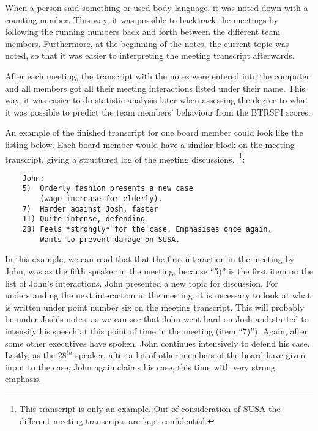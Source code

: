 \documentclass[a4paper,12pt,titlepage]{report}
\begin{document}
  When a person said something or used body language, it was noted down with a
  counting number. This way, it was possible to backtrack the meetings by following
  the running numbers back and forth between the different team members.
  Furthermore, at the beginning of the notes, the current topic was noted, so that it was
  easier to interpreting the meeting transcript afterwards.

  After each meeting, the transcript with the notes were entered into the computer
  and all members got all their meeting interactions listed under their
  name. This way, it was easier to do statistic analysis later when
  assessing the degree to what it was possible to predict
  the team members' behaviour from the BTRSPI scores. 

  An example of the finished transcript for one board member could
  look like the listing below. Each board member would have a
  similar block on the meeting transcript, giving a structured
  log of the meeting discussions.~\footnote{This transcript is only an example. Out of consideration of SUSA the
  different meeting transcripts are kept confidential.}:

  \begin{verbatim}
    John:
    5)  Orderly fashion presents a new case
        (wage increase for elderly).
    7)  Harder against Josh, faster
    11) Quite intense, defending
    28) Feels *strongly* for the case. Emphasises once again.
        Wants to prevent damage on SUSA.
  \end{verbatim}

  In this example, we can read that that the first interaction
  in the meeting by John, was as the fifth speaker in the meeting, because
  ``5)''  is the first item on the list of John's interactions. 
  John presented a new topic for discussion.
  For understanding the next interaction in the meeting, it
  is necessary to look at what is written under point number six
  on the meeting transcript. This will probably be
  under Josh's notes, as we can see that John
  went hard on Josh and started to intensify his speech at this
  point of time in the meeting (item ``7)'').
  Again, after some other executives have spoken, John
  continues intensively to defend his case. Lastly, as the
  \begin{math} 28^{th} \end{math} speaker, after a lot of other members
  of the board have given input to the case, John again claims his case,
  this time with very strong emphasis.
\end{document}
